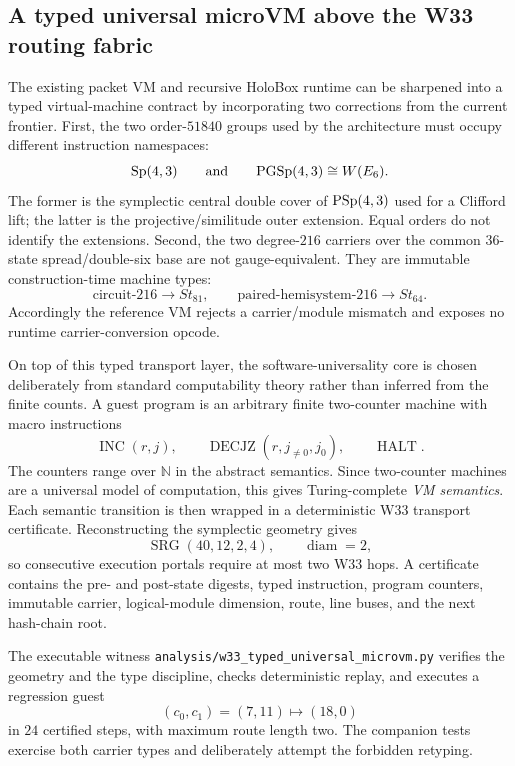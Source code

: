 
\subsection{A typed universal microVM above the W33 routing fabric}

The existing packet VM and recursive HoloBox runtime can be sharpened into a
typed virtual-machine contract by incorporating two corrections from the
current frontier. First, the two order-$51840$ groups used by the architecture
must occupy different instruction namespaces:
\[
 \mathrm{Sp}(4,3)
 \qquad\hbox{and}\qquad
 \mathrm{PGSp}(4,3)\cong W(E_6).
\]
The former is the symplectic central double cover of $\mathrm{PSp}(4,3)$ used for a
Clifford lift; the latter is the projective/similitude outer extension. Equal
orders do not identify the extensions. Second, the two degree-$216$ carriers
over the common $36$-state spread/double-six base are not gauge-equivalent.
They are immutable construction-time machine types:
\[
 \text{circuit-216}\longrightarrow St_{81},
 \qquad
 \text{paired-hemisystem-216}\longrightarrow St_{64}.
\]
Accordingly the reference VM rejects a carrier/module mismatch and exposes no
runtime carrier-conversion opcode.

On top of this typed transport layer, the software-universality core is chosen
deliberately from standard computability theory rather than inferred from the
finite counts. A guest program is an arbitrary finite two-counter machine with
macro instructions
\[
 \operatorname{INC}(r,j),\qquad
 \operatorname{DECJZ}(r,j_{\ne0},j_0),\qquad
 \operatorname{HALT}.
\]
The counters range over $\mathbb N$ in the abstract semantics. Since
two-counter machines are a universal model of computation, this gives
Turing-complete \emph{VM semantics}. Each semantic transition is then wrapped
in a deterministic W33 transport certificate. Reconstructing the symplectic
geometry gives
\[
 \operatorname{SRG}(40,12,2,4),\qquad \operatorname{diam}=2,
\]
so consecutive execution portals require at most two W33 hops. A certificate
contains the pre- and post-state digests, typed instruction, program counters,
immutable carrier, logical-module dimension, route, line buses, and the next
hash-chain root.

The executable witness
\texttt{analysis/w33\_typed\_universal\_microvm.py} verifies the geometry and
the type discipline, checks deterministic replay, and executes a regression
guest
\[
 (c_0,c_1)=(7,11)\longmapsto(18,0)
\]
in $24$ certified steps, with maximum route length two. The companion tests
exercise both carrier types and deliberately attempt the forbidden retyping.

